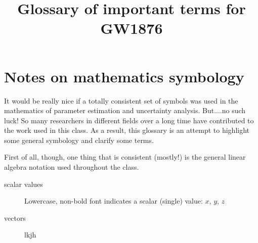 \documentclass[english]{article}
\begin{document}
\title{Glossary of important terms for GW1876}
\maketitle

\section*{Notes on mathematics symbology}
It would be really nice if a totally consistent set of symbols was used in the mathematics of parameter estimation and uncertainty analysis. But....no such luck! So many researchers in different fields over a long time have contributed to the work used in this class. As a result, this glossary is an attempt to highlight some general symbology and clarify some terms.

First of all, though, one thing that is consistent (mostly!) is the general linear algebra notation used throughout the class.
\begin{description}
\item[scalar values] Lowercase, non-bold font indicates a scalar (single) value: $x$, $y$, $z$
\item[vectors] lkjh
\end{description}
\end{document}
